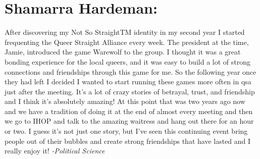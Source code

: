 \section*{Shamarra Hardeman:}
After discovering my Not So StraightTM identity in my second year I started 
frequenting the Queer Straight Alliance every week. The president at the time, 
Jamie, introduced the game Warewolf to the group. I thought it was a great 
bonding experience for the local queers, and it was easy to build a lot of 
strong connections and friendships through this game for me. So the following 
year once they had left I decided I wanted to start running these games more 
often in qsa just after the meeting. It's a lot of crazy stories of betrayal, 
trust, and friendship and I think it's absolutely amazing! At this point that 
was two years ago now and we have a tradition of doing it at the end of almost 
every meeting and then we go to IHOP and talk to the amazing waitress and hang 
out there for an hour or two. I guess it's not just one story, but I've seen 
this continuing event bring people out of their bubbles and create strong 
friendships that have lasted and I really enjoy it!
\textit{-Political Science}
